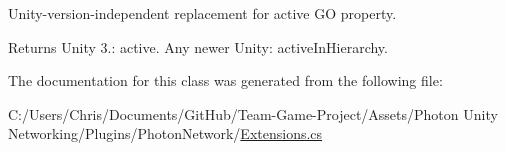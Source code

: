 Unity-\/version-\/independent replacement for active GO property. 

\begin{DoxyReturn}{Returns}
Unity 3.\+: active. Any newer Unity\+: active\+In\+Hierarchy.
\end{DoxyReturn}


The documentation for this class was generated from the following file\+:\begin{DoxyCompactItemize}
\item 
C\+:/\+Users/\+Chris/\+Documents/\+Git\+Hub/\+Team-\/\+Game-\/\+Project/\+Assets/\+Photon Unity Networking/\+Plugins/\+Photon\+Network/\hyperlink{_extensions_8cs}{Extensions.\+cs}\end{DoxyCompactItemize}
